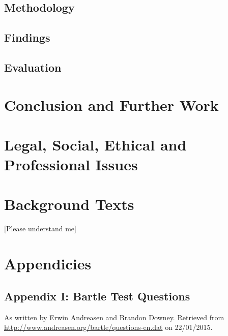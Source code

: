 \documentclass[12pt]{article}
\begin{document}
\subsection{Methodology}

\subsection{Findings}

\subsection{Evaluation}

\section{Conclusion and Further Work}

\section{Legal, Social, Ethical and Professional Issues}
\label{sec:issues}

\section{Background Texts}
[Please understand me]

\section{Appendicies}
\subsection{Appendix I: Bartle Test Questions}
As written by Erwin Andreasen and Brandon Downey. Retrieved from \url{http://www.andreasen.org/bartle/questions-en.dat} on 22/01/2015.
\linespread{1.0}

\linespread{1.3}



\end{document}
